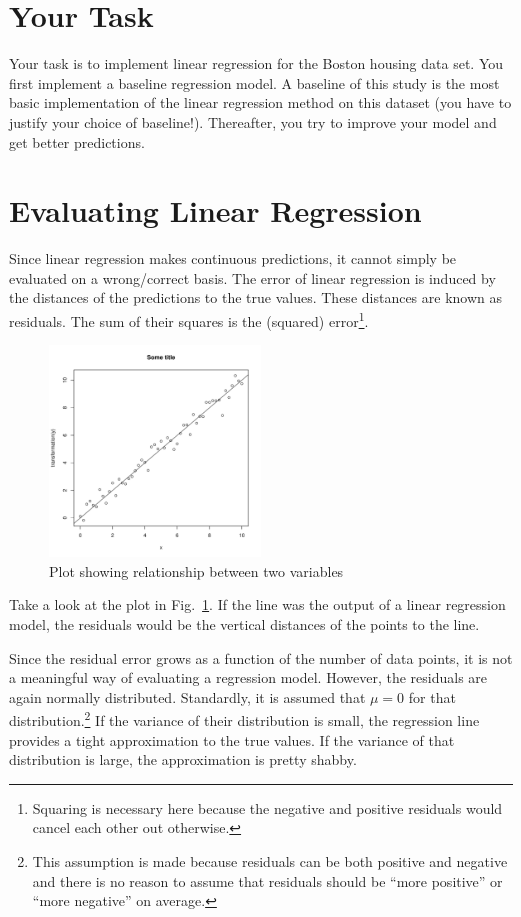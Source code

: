 \documentclass[11pt, leqno, a4paper]{article}
\begin{document}
\section{Your Task}

Your task is to implement linear regression for the Boston housing data set. You first implement a baseline regression model. A baseline of this study is the most basic implementation of the linear regression method on this dataset (you have to justify your choice of 
baseline!). Thereafter, you try to improve your model and get better predictions.

\section{Evaluating Linear Regression}

Since linear regression makes continuous predictions, it cannot simply be evaluated on a wrong/correct
basis. The error of linear regression is induced by the distances of the predictions to the true values.
These distances are known as residuals. The sum of their squares is the (squared) error\footnote{Squaring
is necessary here because the negative and positive residuals would cancel each other out otherwise.}. 

\begin{figure}
    \begin{center}
    \includegraphics[width=0.5\textwidth]{plot.pdf}
    \end{center}
    \caption{Plot showing relationship between two variables\label{fig1}}
\end{figure}

Take a look at the plot in Fig.~\ref{fig1}. If the line was the output of a linear 
regression model, the residuals would be the vertical distances of the points to the line.

Since the residual error grows as a function of the number of data points, it is not a meaningful
way of evaluating a regression model. However, the residuals are again normally distributed. Standardly,
it is assumed that $ \mu=0 $ for that distribution.\footnote{This assumption is made because
residuals can be both positive and negative and there is no reason to assume that residuals should
be ``more positive'' or ``more negative'' on average.} If the
variance of their distribution is small, the regression line provides a tight approximation to the
true values. If the variance of that distribution is large, the approximation is pretty shabby. 
\end{document}

